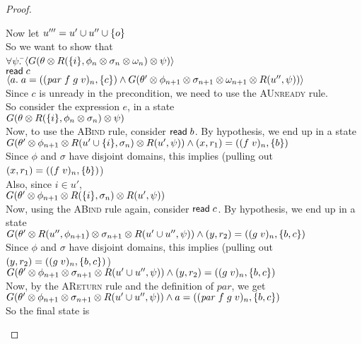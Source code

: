 \begin{proof}
\begin{tabbedproof}
\oo Now let $u''' = u' \cup u'' \cup \{{o}\}$ \\
\oo So we want to show that \\
\oo $\forall \psi.\;$\=$\left<G(\theta \otimes R(\{{i}\},\phi_n \otimes \sigma_n \otimes \omega_n) \otimes \psi)\right>$ \\
\oo \> ${\mathsf{read}\; c}$ \\
\oo \> $\left<{a.\;a = ((\mathit{par}\;f\;g\;v)_n, \{{c}\}) \land G(\theta' \otimes \phi_{n+1} \otimes \sigma_{n+1} \otimes \omega_{n+1} \otimes R(u'', \psi))}\right>$ \\
\oo Since $c$ is unready in the precondition, we need to use the \textsc{AUnready} rule. \\
\oo So consider the expression $e$, in a state \\
\oo $G(\theta \otimes R(\{{i}\},\phi_n \otimes \sigma_n) \otimes \psi)$ \\
\oo Now, to use the \textsc{ABind} rule, consider  $\mathsf{read}\; b$. By hypothesis, we end up in a state \\
\oo $G(\theta' \otimes \phi_{n+1} \otimes R(u' \cup \{{i}\},\sigma_n) \otimes R(u', \psi)) \land (x,r_1) = ((f\;v)_n, \{{b}\})$ \\
\oo Since $\phi$ and $\sigma$ have disjoint domains, this implies (pulling out $(x,r_1) = ((f\;v)_n, \{{b}\})$) \\
\oo Also, since $i \in u'$, \\
\oo $G(\theta' \otimes \phi_{n+1} \otimes R(\{{i}\},\sigma_n) \otimes R(u', \psi))$ \\
\oo Now, using the \textsc{ABind} rule again, consider $\mathsf{read}\; c$. By hypothesis, we end up in a state \\
\oo $G(\theta' \otimes R(u'',\phi_{n+1}) \otimes \sigma_{n+1} \otimes R(u' \cup u'', \psi)) \land (y,r_2) = ((g\;v)_n, \{{b, c}\})$ \\
\oo Since $\phi$ and $\sigma$ have disjoint domains, this implies (pulling out $(y,r_2) = ((g\;v)_n, \{{b, c}\})$) \\
\oo $G(\theta' \otimes \phi_{n+1} \otimes \sigma_{n+1} \otimes R(u' \cup u'', \psi)) \land (y, r_2) = ((g\;v)_n, \{{b,c}\})$ \\
\oo Now, by the \textsc{AReturn} rule and the definition of $\mathit{par}$, we get \\
\oo $G(\theta' \otimes \phi_{n+1} \otimes \sigma_{n+1} \otimes R(u' \cup u'', \psi)) \land a = ((\mathit{par}\;f\;g\;v)_n, \{{b,c}\})$ \\
\oo So the final state is \\

\end{tabbedproof}
\end{proof}
